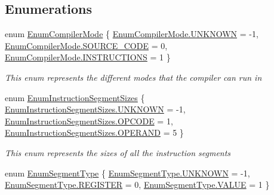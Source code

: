 \subsection*{Enumerations}
\begin{DoxyCompactItemize}
\item 
enum \hyperlink{namespace_c_p_u___o_s___simulator_1_1_compiler_ada8d93b571fa15a0f2eac8c9647a89fe}{Enum\+Compiler\+Mode} \{ \hyperlink{namespace_c_p_u___o_s___simulator_1_1_compiler_ada8d93b571fa15a0f2eac8c9647a89fea696b031073e74bf2cb98e5ef201d4aa3}{Enum\+Compiler\+Mode.\+U\+N\+K\+N\+O\+W\+N} = -\/1, 
\hyperlink{namespace_c_p_u___o_s___simulator_1_1_compiler_ada8d93b571fa15a0f2eac8c9647a89feac31dd0847839ccae1447bac2f474a003}{Enum\+Compiler\+Mode.\+S\+O\+U\+R\+C\+E\+\_\+\+C\+O\+D\+E} = 0, 
\hyperlink{namespace_c_p_u___o_s___simulator_1_1_compiler_ada8d93b571fa15a0f2eac8c9647a89fea94a4525d62a2828c7aa1f8dc47a0ffb5}{Enum\+Compiler\+Mode.\+I\+N\+S\+T\+R\+U\+C\+T\+I\+O\+N\+S} = 1
 \}\begin{DoxyCompactList}\small\item\em This enum represents the different modes that the compiler can run in \end{DoxyCompactList}
\item 
enum \hyperlink{namespace_c_p_u___o_s___simulator_1_1_compiler_ab24a50fa4ad8696ea835641857ef3108}{Enum\+Instruction\+Segment\+Sizes} \{ \hyperlink{namespace_c_p_u___o_s___simulator_1_1_compiler_ab24a50fa4ad8696ea835641857ef3108a696b031073e74bf2cb98e5ef201d4aa3}{Enum\+Instruction\+Segment\+Sizes.\+U\+N\+K\+N\+O\+W\+N} = -\/1, 
\hyperlink{namespace_c_p_u___o_s___simulator_1_1_compiler_ab24a50fa4ad8696ea835641857ef3108a11bdee9fdefbd8d33a25257557bddbef}{Enum\+Instruction\+Segment\+Sizes.\+O\+P\+C\+O\+D\+E} = 1, 
\hyperlink{namespace_c_p_u___o_s___simulator_1_1_compiler_ab24a50fa4ad8696ea835641857ef3108a11f3de9b2b548c31805cf34d512ee177}{Enum\+Instruction\+Segment\+Sizes.\+O\+P\+E\+R\+A\+N\+D} = 5
 \}\begin{DoxyCompactList}\small\item\em This enum represents the sizes of all the instruction segments \end{DoxyCompactList}
\item 
enum \hyperlink{namespace_c_p_u___o_s___simulator_1_1_compiler_aa05e0a6530329354660230dd223cca81}{Enum\+Segment\+Type} \{ \hyperlink{namespace_c_p_u___o_s___simulator_1_1_compiler_aa05e0a6530329354660230dd223cca81a696b031073e74bf2cb98e5ef201d4aa3}{Enum\+Segment\+Type.\+U\+N\+K\+N\+O\+W\+N} = -\/1, 
\hyperlink{namespace_c_p_u___o_s___simulator_1_1_compiler_aa05e0a6530329354660230dd223cca81ad17455cfcb88a53f1603fb817e09c2d6}{Enum\+Segment\+Type.\+R\+E\+G\+I\+S\+T\+E\+R} = 0, 
\hyperlink{namespace_c_p_u___o_s___simulator_1_1_compiler_aa05e0a6530329354660230dd223cca81aecc2e9c313faddb07e7da223c1dc5c3f}{Enum\+Segment\+Type.\+V\+A\+L\+U\+E} = 1
 \}
\end{DoxyCompactItemize}


